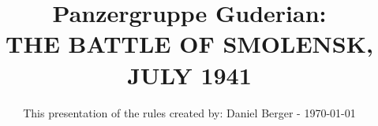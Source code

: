 \documentclass[a4paper,11pt,twocolumn]{article}
\title{
  Panzergruppe Guderian: \\
  THE BATTLE OF SMOLENSK, JULY 1941
}
\author{This presentation of the rules created by: Daniel Berger - \today}
\date{}
\begin{document}
  \raggedbottom
  \maketitle
  \tableofcontents
  \clearpage
  
  
  
  
  
  \clearpage
  
  
  
  
  
  
  
  
  
  
  
  \clearpage
  
  
\end{document}
